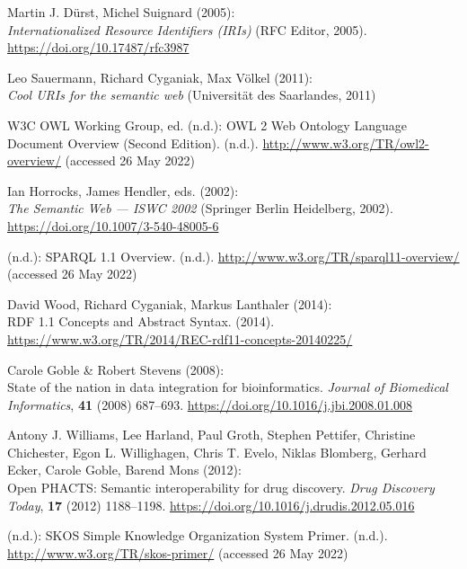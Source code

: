 \begin{thebibliography}{9}
Martin J. Dürst, Michel Suignard (2005): \\
\emph{Internationalized
{Resource Identifiers} ({IRIs})} ({RFC Editor}, 2005).
\url{https://doi.org/10.17487/rfc3987}

Leo Sauermann, Richard Cyganiak, Max Völkel (2011): \\
\emph{Cool {URIs}
for the semantic web} ({Universität des Saarlandes}, 2011)

W3C OWL Working Group, ed. (n.d.): {OWL} 2 {Web Ontology Language
Document Overview} ({Second Edition}). (n.d.).
\url{http://www.w3.org/TR/owl2-overview/} (accessed 26 May 2022)

Ian Horrocks, James Hendler, eds. (2002): \\
\emph{The {Semantic Web} ---
{ISWC} 2002} ({Springer Berlin Heidelberg}, 2002).
\url{https://doi.org/10.1007/3-540-48005-6}

(n.d.): {SPARQL} 1.1 {Overview}. (n.d.).
\url{http://www.w3.org/TR/sparql11-overview/} (accessed 26 May 2022)

David Wood, Richard Cyganiak, Markus Lanthaler (2014): \\
{RDF 1.1
Concepts and Abstract Syntax}. (2014).
\url{https://www.w3.org/TR/2014/REC-rdf11-concepts-20140225/}

Carole Goble \& Robert Stevens (2008): \\
State of the nation in data
integration for bioinformatics. \emph{Journal of Biomedical
Informatics}, \textbf{41} (2008) 687--693.
\url{https://doi.org/10.1016/j.jbi.2008.01.008}

Antony J. Williams, Lee Harland, Paul Groth, Stephen Pettifer, Christine
Chichester, Egon L. Willighagen, Chris T. Evelo, Niklas Blomberg,
Gerhard Ecker, Carole Goble, Barend Mons (2012): \\
Open {PHACTS}:
Semantic interoperability for drug discovery. \emph{Drug Discovery
Today}, \textbf{17} (2012) 1188--1198.
\url{https://doi.org/10.1016/j.drudis.2012.05.016}

(n.d.): {SKOS Simple Knowledge Organization System Primer}. (n.d.).
\url{http://www.w3.org/TR/skos-primer/} (accessed 26 May 2022)


\end{thebibliography}
